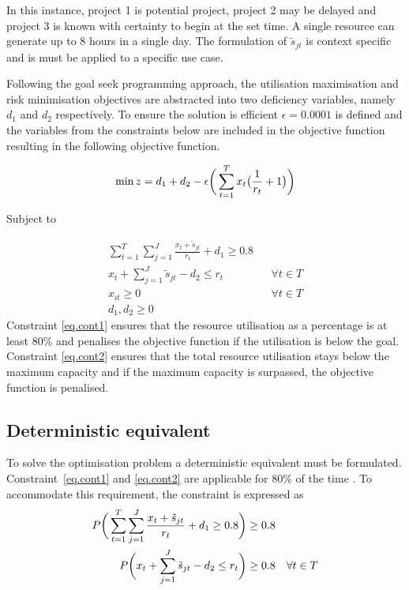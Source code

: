 \documentclass[a4paper,11pt]{article}
\begin{document}
In this instance, project 1 is potential project, project 2 may be delayed and project 3 is known with certainty to begin at the set time. A single resource can generate up to 8 hours in a single day. The formulation of $\tilde{s}_{jt}$ is context specific and is must be applied to a specific use case.

Following the goal seek programming approach, the utilisation maximisation and risk minimisation objectives are abstracted into two deficiency variables, namely $d_1$ and $d_2$ respectively. To ensure the solution is efficient $\epsilon = 0.0001$ is defined and the variables from the constraints below are included in the objective function resulting in the following objective function.

\begin{equation}
	\min z = d_1 + d_2 - \epsilon \bigg{(} \sum_{t=1}^T x_{t}\big{(}\frac{1}{r_t}+1 \big{)} \bigg{)}
\end{equation}

Subject to

\begin{align}
	\label{eq.cont1}
	\sum_{t=1}^T\sum_{j=1}^J \frac{x_{t}+\tilde{s}_{jt}}{r_t} +d_1 \geq 0.8  \\ 
	\label{eq.cont2}
	x_{t} + \sum_{j=1}^J \tilde{s}_{jt} -d_2\leq r_t && \forall t \in T \\
	x_{it} \geq 0 &&  \forall t \in T \\
		d_1,d_2 \geq 0
\end{align}
Constraint \ref{eq.cont1} ensures that the resource utilisation as a percentage is at least 80\% and penalises the objective function if the utilisation is below the goal. Constraint \ref{eq.cont2} ensures that the total resource utilisation stays below the maximum capacity and if the maximum capacity is surpassed, the objective function is penalised.

\subsection{Deterministic equivalent}
To solve the optimisation problem a deterministic equivalent must be formulated. 
Constraint~\ref{eq.cont1} and \ref{eq.cont2} are applicable for 80\% of the time \citep{nemirovski2006scenario}. To accommodate this requirement, the constraint is expressed as
 \begin{align}
 \label{eq:det1}
	P\bigg{(}\sum_{t=1}^T\sum_{j=1}^J \frac{x_{t}+\tilde{s}_{jt}}{r_t} +d_1 \geq 0.8\bigg{)} \geq 0.8  \\ 
	 \label{eq:det2}
	P\bigg{(} x_{t} + \sum_{j=1}^J \tilde{s}_{jt} -d_2\leq r_t\bigg{)} \geq 0.8  && \forall t \in T 
\end{align}
 
\end{document}
